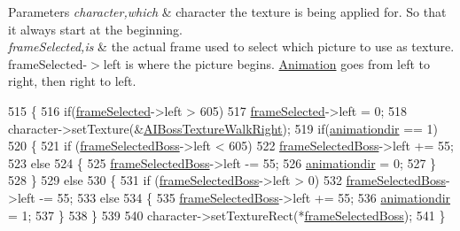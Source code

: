 \begin{DoxyParams}{Parameters}
{\em character,which} & character the texture is being applied for. So that it always start at the beginning. \\
\hline
{\em frame\+Selected,is} & the actual frame used to select which picture to use as texture. frame\+Selected-\/$>$left is where the picture begins. \hyperlink{classAnimation}{Animation} goes from left to right, then right to left. \\
\hline
\end{DoxyParams}

\begin{DoxyCode}
515 \{
516     \textcolor{keywordflow}{if}(\hyperlink{classAnimation_ad46a2f93624e4c2ed6df5852d1e43306}{frameSelected}->left > 605)
517         \hyperlink{classAnimation_ad46a2f93624e4c2ed6df5852d1e43306}{frameSelected}->left = 0;
518     character->setTexture(&\hyperlink{classAnimation_a2de9d819490c4799986cda87f8c9f498}{AIBossTextureWalkRight});
519     \textcolor{keywordflow}{if}(\hyperlink{classAnimation_a1e2bb6d1c9f98f54006d4e38a60b0843}{animationdir} == 1)
520     \{
521         \textcolor{keywordflow}{if} (\hyperlink{classAnimation_a642ba989c928d568640537c2c4233047}{frameSelectedBoss}->left < 605)
522             \hyperlink{classAnimation_a642ba989c928d568640537c2c4233047}{frameSelectedBoss}->left += 55;
523         \textcolor{keywordflow}{else}
524         \{
525             \hyperlink{classAnimation_a642ba989c928d568640537c2c4233047}{frameSelectedBoss}->left -= 55;
526             \hyperlink{classAnimation_a1e2bb6d1c9f98f54006d4e38a60b0843}{animationdir} = 0;
527         \}
528     \}
529     \textcolor{keywordflow}{else}
530     \{
531         \textcolor{keywordflow}{if} (\hyperlink{classAnimation_a642ba989c928d568640537c2c4233047}{frameSelectedBoss}->left > 0)
532             \hyperlink{classAnimation_a642ba989c928d568640537c2c4233047}{frameSelectedBoss}->left -= 55;
533         \textcolor{keywordflow}{else}
534         \{
535             \hyperlink{classAnimation_a642ba989c928d568640537c2c4233047}{frameSelectedBoss}->left += 55;
536             \hyperlink{classAnimation_a1e2bb6d1c9f98f54006d4e38a60b0843}{animationdir} = 1;
537         \}
538     \}
539 
540     character->setTextureRect(*\hyperlink{classAnimation_a642ba989c928d568640537c2c4233047}{frameSelectedBoss});
541 \}
\end{DoxyCode}
